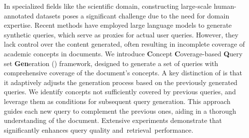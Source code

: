 In specialized fields like the scientific domain, constructing large-scale human-annotated datasets poses a significant challenge due to the need for domain expertise.
Recent methods have employed large language models to generate synthetic queries, which serve as proxies for actual user queries.
However, they lack control over the content generated, often resulting in incomplete coverage of academic concepts in documents. %
We introduce \textbf{C}oncept \textbf{C}overage-based \textbf{Q}uery set \textbf{Gen}eration (\textbf{\proposed}) framework, designed to generate a set of queries with comprehensive coverage of the document's concepts.
A key distinction of \proposed is that it adaptively adjusts the generation process based on the previously generated queries.
We identify concepts not sufficiently covered by previous queries, and leverage them as conditions for subsequent query generation.
This approach guides each new query to complement the previous ones, aiding in a thorough understanding of the document.
Extensive experiments demonstrate that \proposed significantly enhances query quality and~retrieval~performance.

% 